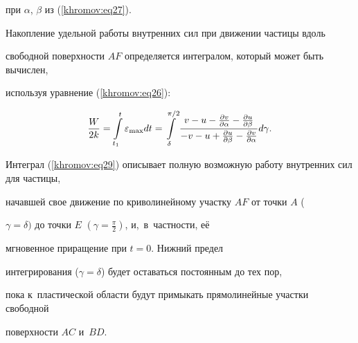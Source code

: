 \vspace{-2mm}



\noindent

при $\alpha$, $\beta $ из (\ref{khromov:eq27}).



Накопление удельной работы внутренних сил при движении частицы вдоль 

свободной поверхности $AF$ определяется интегралом, который может быть вычислен, 

используя уравнение (\ref{khromov:eq26}):



\vspace{-2mm}

\begin{equation}

\label{khromov:eq29}

\frac{W}{2k} = \int\limits_{t_1 }^t {\varepsilon _{\max} dt} = 

\int\limits_\delta ^{\pi \mathord{\left/ {\vphantom {\pi 2}} \right. 

\kern-\nulldelimiterspace} 2} {\frac{v - u - \frac{\partial v}{\partial 

\alpha } - \frac{\partial u}{\partial \beta }}{ - v - u + \frac{\partial 

u}{\partial \beta } - \frac{\partial v}{\partial \alpha }}d\gamma } .

\end{equation}

\vspace{-2mm}



Интеграл (\ref{khromov:eq29}) описывает полную возможную работу внутренних сил для частицы, 

начавшей свое движение по криволинейному участку $AF$ от точки $A$ (

$\gamma = \delta )$ до точки $E$  $\left({\gamma = \frac{\pi }{2}} \right)$, и,~в~частности, её 

мгновенное приращение при $t = 0$. Нижний предел 

интегрирования ($\gamma = \delta $) будет оставаться постоянным до тех пор, 

пока к~пластической области будут примыкать прямолинейные участки свободной 

поверхности $AC$ и~$BD$.





